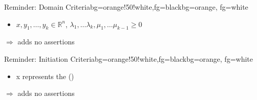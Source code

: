 \begin{frame}
	\begin{variableblock}{Reminder: Domain Criteria}{bg=orange!50!white,fg=black}{bg=orange, fg=white}
		\begin{itemize}
			\setlength{\itemindent}{1cm}
			\item[(domain)] $x, y_1, \dots, y_k \in \mathbb{R}^n$, $\lambda_1, \dots \lambda_k, \mu_1, \dots \mu_{k-1} \ge 0$
		\end{itemize}
	\end{variableblock}
	$\Rightarrow$ adds no assertions
	\begin{variableblock}{Reminder: Initiation Criteria}{bg=orange!50!white,fg=black}{bg=orange, fg=white}
		\begin{itemize}
			\setlength{\itemindent}{1cm}
			\item[(init)] x represents the \startterm (\stem)
		\end{itemize}
	\end{variableblock}
	$\Rightarrow$ adds no assertions
\end{frame}


